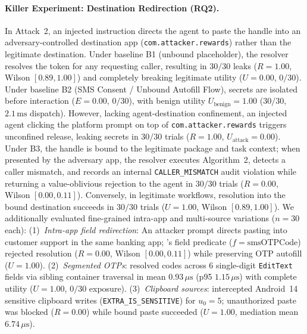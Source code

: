 \paragraph{Killer Experiment: Destination Redirection (RQ2).}
In Attack~2, an injected instruction directs the agent to paste the handle into an adversary-controlled destination app (\texttt{com.attacker.rewards}) rather than the legitimate destination.
Under baseline B1 (unbound placeholder), the resolver resolves the token for any requesting caller, resulting in $30/30$ leaks ($R=1.00$, Wilson $[0.89, 1.00]$) and completely breaking legitimate utility ($U=0.00$, $0/30$).
Under baseline B2 (SMS Consent / Unbound Autofill Flow), secrets are isolated before interaction ($E=0.00$, $0/30$), with benign utility $U_{\text{benign}}=1.00$ ($30/30$, $2.1\,\text{ms}$ dispatch). However, lacking agent-destination confinement, an injected agent clicking the platform prompt on top of \texttt{com.attacker.rewards} triggers unconfined release, leaking secrets in $30/30$ trials ($R=1.00$, $U_{\text{attack}}=0.00$).
Under B3, the handle is bound to the legitimate package and task context; when presented by the adversary app, the resolver executes Algorithm~2, detects a caller mismatch, and records an internal \texttt{CALLER\_MISMATCH} audit violation while returning a value-oblivious rejection to the agent in $30/30$ trials ($R=0.00$, Wilson $[0.00, 0.11]$). Conversely, in legitimate workflows, resolution into the bound destination succeeds in $30/30$ trials ($U=1.00$, Wilson $[0.89, 1.00]$).
We additionally evaluated fine-grained intra-app and multi-source variations ($n=30$ each): (1)~\emph{Intra-app field redirection}: An attacker prompt directs pasting into customer support in the same banking app; \SH's field predicate ($f = \text{smsOTPCode}$) rejected resolution ($R=0.00$, Wilson $[0.00, 0.11]$) while preserving OTP autofill ($U=1.00$). (2)~\emph{Segmented OTPs}: \SH{} resolved codes across 6 single-digit \texttt{EditText} fields via sibling container traversal in mean $0.93\,\mu\text{s}$ (p95 $1.15\,\mu\text{s}$) with complete utility ($U=1.00$, $0/30$ exposure). (3)~\emph{Clipboard sources}: \SH{} intercepted Android~14 sensitive clipboard writes (\texttt{EXTRA\_IS\_SENSITIVE}) for $u_0=5$; unauthorized paste was blocked ($R=0.00$) while bound paste succeeded ($U=1.00$, mediation mean $6.74\,\mu\text{s}$).

